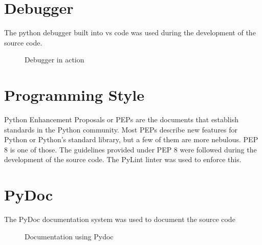   \section{Debugger}
    The python debugger built into vs code was used during the development of the source code.
    \begin{figure}[h!]
      \centering
      \caption{Debugger in action}
      \label{fig:Debugger}
    \end{figure}

  \section{Programming Style}
  Python Enhancement Proposals or PEPs are the documents that establish standards in the Python community. Most PEPs describe new features for Python or Python's standard library, but a few of them are more nebulous. PEP 8 is one of those\cite{python}. The guidelines provided under PEP 8 were followed during the development of the source code. The PyLint linter was used to enforce this. 

  \pagebreak
  \section{PyDoc}
    The PyDoc documentation system was used to document the source code
    \begin{figure}[h!]
      \centering
      \caption{Documentation using Pydoc}
      \label{fig:pydoc}
    \end{figure}


